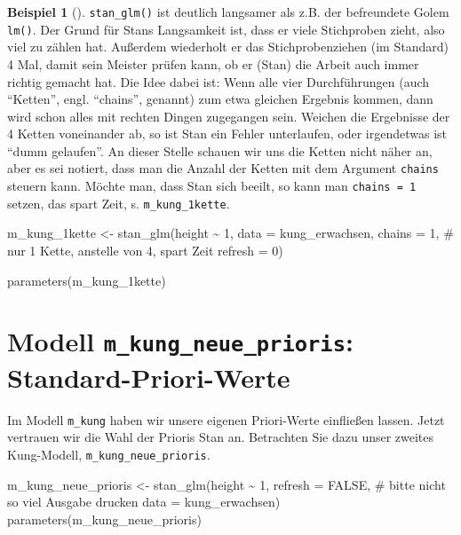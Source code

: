\documentclass[
  ngerman,
  letterpaper,
  twoside,
  open=any]{scrbook}
\newenvironment{Shaded}{\begin{snugshade}}{\end{snugshade}}
\newcommand{\AttributeTok}[1]{\textcolor[rgb]{0.40,0.45,0.13}{#1}}
\newcommand{\CommentTok}[1]{\textcolor[rgb]{0.37,0.37,0.37}{#1}}
\newcommand{\ConstantTok}[1]{\textcolor[rgb]{0.56,0.35,0.01}{#1}}
\newcommand{\DecValTok}[1]{\textcolor[rgb]{0.68,0.00,0.00}{#1}}
\newcommand{\FunctionTok}[1]{\textcolor[rgb]{0.28,0.35,0.67}{#1}}
\newcommand{\NormalTok}[1]{\textcolor[rgb]{0.00,0.23,0.31}{#1}}
\newcommand{\OtherTok}[1]{\textcolor[rgb]{0.00,0.23,0.31}{#1}}
\newcommand{\SpecialCharTok}[1]{\textcolor[rgb]{0.37,0.37,0.37}{#1}}
\theoremstyle{definition}
\newtheorem{example}{Beispiel}[chapter]
\theoremstyle{plain}
\theoremstyle{definition}
\theoremstyle{definition}
\theoremstyle{remark}
\begin{document}
\begin{example}[]
\texttt{stan\_glm()} ist deutlich langsamer als z.B. der befreundete
Golem \texttt{lm()}. Der Grund für Stans Langsamkeit ist, dass er viele
Stichproben zieht, also viel zu zählen hat. Außerdem wiederholt er das
Stichprobenziehen (im Standard) 4 Mal, damit sein Meister prüfen kann,
ob er (Stan) die Arbeit auch immer richtig gemacht hat. Die Idee dabei
ist: Wenn alle vier Durchführungen (auch \enquote{Ketten}, engl.
\enquote{chains}, genannt) zum etwa gleichen Ergebnis kommen, dann wird
schon alles mit rechten Dingen zugegangen sein. Weichen die Ergebnisse
der 4 Ketten voneinander ab, so ist Stan ein Fehler unterlaufen, oder
irgendetwas ist \enquote{dumm gelaufen}. An dieser Stelle schauen wir
uns die Ketten nicht näher an, aber es sei notiert, dass man die Anzahl
der Ketten mit dem Argument \texttt{chains} steuern kann. Möchte man,
dass Stan sich beeilt, so kann man \texttt{chains\ =\ 1} setzen, das
spart Zeit, s. \texttt{m\_kung\_1kette}.

\begin{Shaded}
\begin{Highlighting}[]
\NormalTok{m\_kung\_1kette }\OtherTok{\textless{}{-}} \FunctionTok{stan\_glm}\NormalTok{(height }\SpecialCharTok{\textasciitilde{}} \DecValTok{1}\NormalTok{, }
                 \AttributeTok{data =}\NormalTok{ kung\_erwachsen, }
                 \AttributeTok{chains =} \DecValTok{1}\NormalTok{,  }\CommentTok{\# nur 1 Kette, anstelle von 4, spart Zeit}
                 \AttributeTok{refresh =} \DecValTok{0}\NormalTok{) }

\FunctionTok{parameters}\NormalTok{(m\_kung\_1kette)  }
\end{Highlighting}
\end{Shaded}

\section{\texorpdfstring{Modell \texttt{m\_kung\_neue\_prioris}:
Standard-Priori-Werte}{Modell m\_kung\_neue\_prioris: Standard-Priori-Werte}}\label{modell-m_kung_neue_prioris-standard-priori-werte}

Im Modell \texttt{m\_kung} haben wir unsere eigenen Priori-Werte
einfließen lassen. Jetzt vertrauen wir die Wahl der Prioris Stan an.
Betrachten Sie dazu unser zweites Kung-Modell,
\texttt{m\_kung\_neue\_prioris}.

\begin{Shaded}
\begin{Highlighting}[]
\NormalTok{m\_kung\_neue\_prioris }\OtherTok{\textless{}{-}} 
  \FunctionTok{stan\_glm}\NormalTok{(height }\SpecialCharTok{\textasciitilde{}} \DecValTok{1}\NormalTok{,}
           \AttributeTok{refresh =} \ConstantTok{FALSE}\NormalTok{,  }\CommentTok{\# bitte nicht so viel Ausgabe drucken}
           \AttributeTok{data =}\NormalTok{ kung\_erwachsen)}
\FunctionTok{parameters}\NormalTok{(m\_kung\_neue\_prioris)}
\end{Highlighting}
\end{Shaded}


\end{example}
\end{document}
